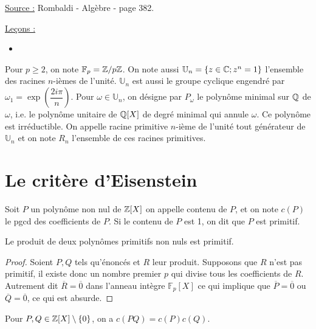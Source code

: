 
\renewcommand{\F}{\mathbb{F}}
\newcommand{\U}{\mathbb{U}}

\pagestyle{fancy}

\fancyhead[C]{}
\fancyhead[R]{}



\underline{Source :} Rombaldi - Algèbre - page 382.

\underline{Leçons :}
\begin{itemize}
\item 
\end{itemize}

\begin{nota}
Pour $p \geq 2$, on note $\F_p = \Z/p\Z$.
On note aussi $\U_n = \set{z \in \Cx ; z^n = 1}$ l'ensemble des racines $n$-ièmes de l'unité.
$\U_n$ est aussi le groupe cyclique engendré par $\omega_1 = \exp \left ( \dfrac{2i \pi}{n} \right )$.
Pour $\omega \in \U_n$, on désigne par $P_{\omega}$ le polynôme minimal sur $\mathbb{Q}$ de $\omega$,
i.e. le polynôme unitaire de $\mathbb{Q}[X]$ de degré minimal qui annule $\omega$. Ce polynôme est irréductible.
On appelle racine primitive $n$-ième de l'unité tout générateur de $\U_n$ et on note $R_n$ l'ensemble
de ces racines primitives.
\end{nota}

\section{Le critère d'Eisenstein}

\begin{defn}[Contenu]
Soit $P$ un polynôme non nul de $\mathbb{Z}[X]$ on appelle contenu de $P$, et on note $c(P)$ le pgcd des coefficients de $P$.
Si le contenu de $P$ est 1, on dit que $P$ est primitif.
\end{defn}

\begin{lem}
\label{lem:1}
Le produit de deux polynômes primitifs non nuls est primitif.
\end{lem}

\begin{proof}
Soient $P, Q$ tels qu'énoncés et $R$ leur produit. Supposons que $R$ n'est pas primitif, il existe donc un nombre premier
$p$ qui divise tous les coefficients de $R$. Autrement dit $\overline{R} = \overline{0}$ dans l'anneau intègre $\F_p[X]$
ce qui implique que $\overline{P} = \overline{0}$ ou $\overline{Q} = \overline{0}$, ce qui est absurde.
\end{proof}

\begin{lem}
\label{lem:2}
Pour $P, Q \in \mathbb{Z}[X] \setminus \{ 0 \}$, on a $c(PQ) = c(P)c(Q)$.
\end{lem}

